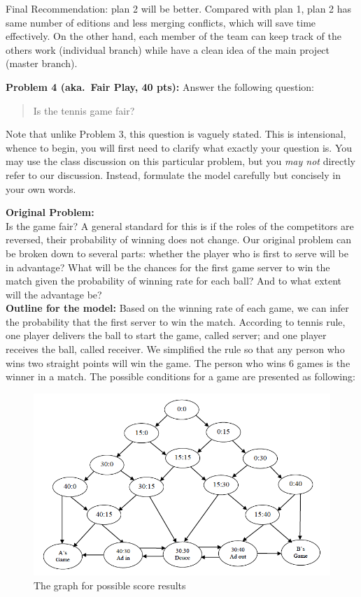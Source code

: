 \documentclass[12pt]{article}
\begin{document}
Final Recommendation: plan 2 will be better. Compared with plan 1, plan 2 has same number of editions and less merging conflicts,  which will save time effectively. On the other hand, each member of the team can keep track of the others work (individual branch) while have a clean idea of the main project (master branch).



\vskip0.25in
\noindent\textbf{Problem 4 (aka.\ Fair Play, 40 pts):}
Answer the following question:
\begin{verse}
Is the tennis game fair?
\end{verse}
Note that unlike Problem 3, this question is vaguely stated.
This is intensional, whence to begin, you will first need to clarify
what exactly your question is.
You may use the class discussion on this particular 
problem, but you \emph{may not} directly refer to our 
discussion.  Instead, formulate the model carefully but concisely in 
your own words.   

\vskip0.25in

\noindent\textbf{Original Problem:}  
\\ Is the game fair? A general standard for this is if the roles of the competitors are reversed, their probability of
winning does not change. Our original problem can be broken down to several parts: whether the player who is first to serve will be in advantage?  What will be the chances for the first game server to win the match given the probability of winning rate for each ball? And to what extent will the advantage be?\\

\noindent\textbf{Outline for the model:}  Based on the winning rate of each game, we can infer the probability that the first server to win the match. According to tennis rule, one player delivers the ball to start the game, called server; and one player receives the ball, called receiver. We simplified the rule so that any person who wins two straight points will win the game. The person who wins 6 games is the winner in a match. The possible conditions for a game are presented as following:

\begin{figure}[h]
    \begin{center}
        \includegraphics[scale=0.6]{graph2.png}
    \end{center}
    \caption{The graph for possible score results}
    \label{fig:branch}
\end{figure}
\end{document}
